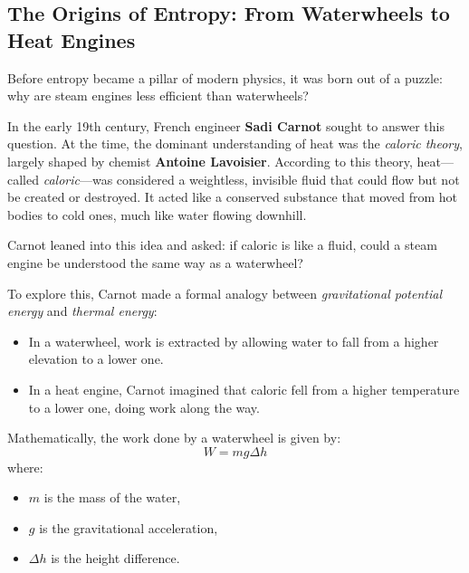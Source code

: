 \subsection{The Origins of Entropy: From Waterwheels to Heat Engines}

Before entropy became a pillar of modern physics, it was born out of a puzzle: why are steam engines less efficient than waterwheels?

In the early 19th century, French engineer \textbf{Sadi Carnot} sought to answer this question. At the time, the dominant understanding of heat was the \emph{caloric theory}, largely shaped by chemist \textbf{Antoine Lavoisier}. According to this theory, heat—called \emph{caloric}—was considered a weightless, invisible fluid that could flow but not be created or destroyed. It acted like a conserved substance that moved from hot bodies to cold ones, much like water flowing downhill.

Carnot leaned into this idea and asked: if caloric is like a fluid, could a steam engine be understood the same way as a waterwheel?

To explore this, Carnot made a formal analogy between \emph{gravitational potential energy} and \emph{thermal energy}:

\begin{itemize}
  \item In a waterwheel, work is extracted by allowing water to fall from a higher elevation to a lower one.
  \item In a heat engine, Carnot imagined that caloric fell from a higher temperature to a lower one, doing work along the way.
\end{itemize}

Mathematically, the work done by a waterwheel is given by:
\[
W = mg \Delta h
\]
where:
\begin{itemize}
  \item \( m \) is the mass of the water,
  \item \( g \) is the gravitational acceleration,
  \item \( \Delta h \) is the height difference.
\end{itemize}



